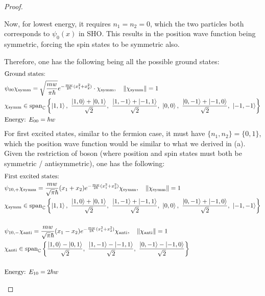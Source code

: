 \documentclass{article}
\begin{document}
\begin{proof}
\begin{itemize}
        \hfil
        
        Now, for lowest energy, it requires $n_1=n_2=0$, which the two particles both corresponds to $\psi_0(x)$ in SHO. This results in the position wave function being symmetric, forcing the spin states to be symmetric also.

        Therefore, one has the following being all the possible ground states:
        \begin{align}
            &\text{Ground states: }\\
            &\psi_{00}\chi_\text{symm} = \sqrt{\frac{mw}{\pi\hbar}}e^{-\frac{mw}{2\hbar}(x_1^2+x_2^2)} \cdot\chi_\text{symm},\quad \|\chi_\text{symm}\|=1\\
            &\chi_\text{symm} \in \textrm{span}_\CC\left\{\ket{1,1},\ \frac{\ket{1,0}+\ket{0,1}}{\sqrt{2}},\ \frac{\ket{1,-1}+\ket{-1,1}}{\sqrt{2}},\ \ket{0,0},\ \frac{\ket{0,-1}+\ket{-1,0}}{\sqrt{2}},\ \ket{-1,-1}\right\}\\
            &\text{Energy: }E_{00} = \hbar w
        \end{align}
        For first excited states, similar to the fermion case, it must have $\{n_1,n_2\}=\{0,1\}$, which the position wave function would be similar to what we derived in (a). Given the restriction of boson (where position and spin states must both be symmetric / antisymmetric), one has the following:
        \begin{align}
            &\text{First excited states: }\\
            &\psi_{10,+}\chi_{\text{symm}} = \frac{mw}{\sqrt{\pi}\hbar}(x_1+x_2)e^{-\frac{mw}{2\hbar}(x_1^2+x_2^2)}\chi_\text{symm},\quad \|\chi_\text{symm}\|=1\\
            &\chi_\text{symm} \in \textrm{span}_\CC\left\{\ket{1,1},\ \frac{\ket{1,0}+\ket{0,1}}{\sqrt{2}},\ \frac{\ket{1,-1}+\ket{-1,1}}{\sqrt{2}},\ \ket{0,0},\ \frac{\ket{0,-1}+\ket{-1,0}}{\sqrt{2}},\ \ket{-1,-1}\right\}\\
            \\
            &\psi_{10,-}\chi_\text{anti} = \frac{mw}{\sqrt{\pi}\hbar}(x_1-x_2)e^{-\frac{mw}{2\hbar}(x_1^2+x_2^2)}\chi_\anti,\quad \|\chi_\anti\|=1\\
            &\chi_\anti\in \text{span}_\CC\left\{\frac{\ket{1,0}-\ket{0,1}}{\sqrt{2}},\ \frac{\ket{1,-1}-\ket{-1,1}}{\sqrt{2}},\ \frac{\ket{0,-1}-\ket{-1,0}}{\sqrt{2}}\right\}\\
            \\
            &\text{Energy: }E_{10} = 2\hbar w
        \end{align}
    \end{itemize}
\end{proof}
\end{document}
